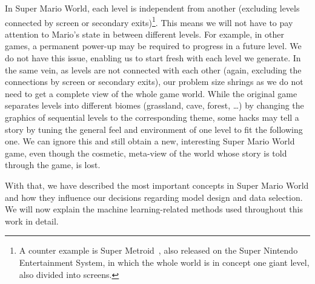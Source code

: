 In Super Mario World, each level is independent from another
(excluding levels connected by screen or secondary exits)\footnote{A
  counter example is Super Metroid~\cite{SuperMetroid2019}, also
  released on the Super Nintendo Entertainment System, in which the
  whole world is in concept one giant level, also divided into
  screens.}. This means we will not have to pay attention to Mario's
state in between different levels. For example, in other games, a
permanent power-up may be required to progress in a future level. We
do not have this issue, enabling us to start fresh with each level we
generate. In the same vein, as levels are not connected with each
other (again, excluding the connections by screen or secondary exits),
our problem size shrings as we do not need to get a complete view of
the whole game world. While the original game separates levels into
different biomes (grassland, cave, forest, \dots) by changing the
graphics of sequential levels to the corresponding theme, some hacks
may tell a story by tuning the general feel and environment of one
level to fit the following one. We can ignore this and still obtain a
new, interesting Super Mario World game, even though the cosmetic,
meta-view of the world whose story is told through the game, is lost.

With that, we have described the most important concepts in Super
Mario World and how they influence our decisions regarding model
design and data selection. We will now explain the machine
learning-related methods used throughout this work in detail.


